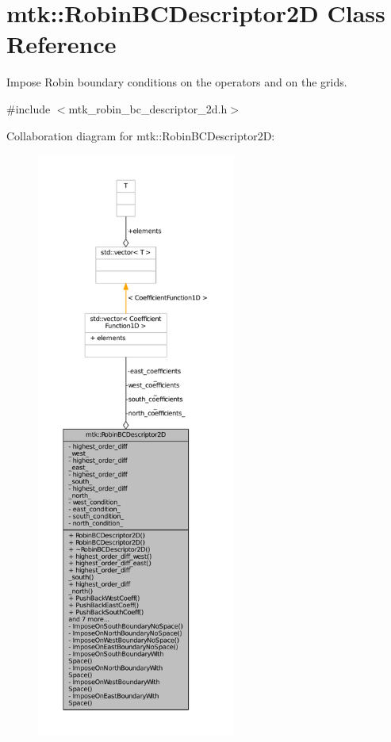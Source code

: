 \hypertarget{classmtk_1_1RobinBCDescriptor2D}{\section{mtk\+:\+:Robin\+B\+C\+Descriptor2\+D Class Reference}
\label{classmtk_1_1RobinBCDescriptor2D}
}


Impose Robin boundary conditions on the operators and on the grids.  




{\ttfamily \#include $<$mtk\+\_\+robin\+\_\+bc\+\_\+descriptor\+\_\+2d.\+h$>$}



Collaboration diagram for mtk\+:\+:Robin\+B\+C\+Descriptor2\+D\+:\nopagebreak
\begin{figure}[H]
\begin{center}
\leavevmode
\includegraphics[height=550pt]{classmtk_1_1RobinBCDescriptor2D__coll__graph}
\end{center}
\end{figure}
